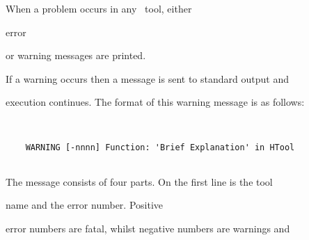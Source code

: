 













%




%














When a problem occurs in any \HTK\ tool, either


error


or warning messages are printed.  





If a warning occurs then a message is sent to standard output and


execution continues. The format of this warning message is as follows:


\begin{verbatim}


    WARNING [-nnnn] Function: 'Brief Explanation' in HTool


\end{verbatim}





The message consists of four parts.  On the first line is the tool


name and the error number.  Positive


error numbers are fatal, whilst negative numbers are warnings and



